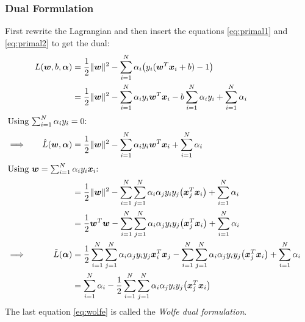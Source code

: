 				\subsubsection{Dual Formulation} %
					First rewrite the Lagrangian and then insert the equations \ref{eq:primal1} and \ref{eq:primal2} to get the dual:
					\begin{align}
						         &  & L(\vec{w}, b, \vec{\alpha})    & = \frac{1}{2} \lVert \vec{w} \rVert^2 - \sum_{i = 1}^{N} \alpha_i \big( y_i (\vec{w}^T \vec{x}_i + b) - 1 \big)                                                                                                           &                  \\
						         &  &                                & = \frac{1}{2} \lVert \vec{w} \rVert^2 - \sum_{i = 1}^{N} \alpha_i y_i \vec{w}^T \vec{x}_i - b \sum_{i = 1}^{N} \alpha_i y_i + \sum_{i = 1}^{N} \alpha_i                                                                   &                  \\
						\intertext{Using \( \sum_{i = 1}^{N} \alpha_i y_i = 0 \):}
						\implies &  & \hat{L}(\vec{w}, \vec{\alpha}) & = \frac{1}{2} \lVert \vec{w} \rVert^2 - \sum_{i = 1}^{N} \alpha_i y_i \vec{w}^T \vec{x}_i + \sum_{i = 1}^{N} \alpha_i                                                                                                     &                  \\
						\intertext{Using \( \vec{w} = \sum_{i = 1}^{N} \alpha_i y_i \vec{x}_i \):}
						         &  &                                & = \frac{1}{2} \lVert \vec{w} \rVert^2 - \sum_{i = 1}^{N} \sum_{j = 1}^{N} \alpha_i \alpha_j y_i y_j \big(\vec{x}_j^T \vec{x}_i\big) + \sum_{i = 1}^{N} \alpha_i                                                           &                  \\
						         &  &                                & = \frac{1}{2} \vec{w}^T \vec{w} - \sum_{i = 1}^{N} \sum_{j = 1}^{N} \alpha_i \alpha_j y_i y_j \big(\vec{x}_j^T \vec{x}_i\big) + \sum_{i = 1}^{N} \alpha_i                                                                 &                  \\
						\implies &  & \tilde{L}(\vec{\alpha})        & = \frac{1}{2} \sum_{i = 1}^{N} \sum_{j = 1}^{N} \alpha_i \alpha_j y_i y_j \vec{x}_i^T \vec{x}_j - \sum_{i = 1}^{N} \sum_{j = 1}^{N} \alpha_i \alpha_j y_i y_j \big(\vec{x}_j^T \vec{x}_i\big) + \sum_{i = 1}^{N} \alpha_i &                  \\
						         &  &                                & = \sum_{i = 1}^{N} \alpha_i - \frac{1}{2} \sum_{i = 1}^{N} \sum_{j = 1}^{N} \alpha_i \alpha_j y_i y_j \big(\vec{x}_j^T \vec{x}_i\big)                                                                                     & \label{eq:wolfe}
					\end{align}
					The last equation \ref{eq:wolfe} is called the \emph{Wolfe dual formulation}.


